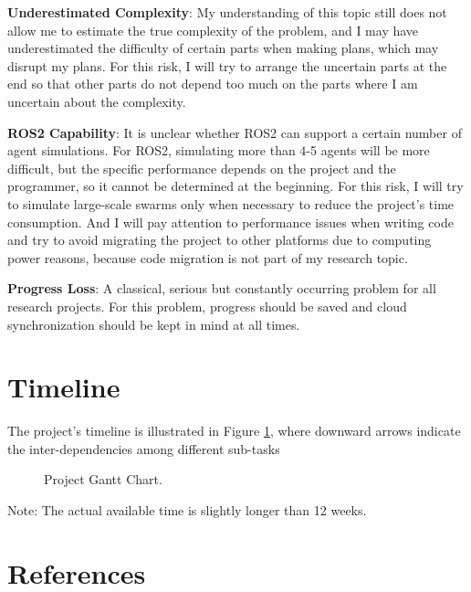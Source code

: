 \documentclass[12pt, oneside]{article}
\begin{document}
\textbf{Underestimated Complexity}: My understanding of this topic still does not allow me to estimate the true complexity of the problem, and I may have underestimated the difficulty of certain parts when making plans, which may disrupt my plans. For this risk, I will try to arrange the uncertain parts at the end so that other parts do not depend too much on the parts where I am uncertain about the complexity.

\textbf{ROS2 Capability}: It is unclear whether ROS2 can support a certain number of agent simulations. For ROS2, simulating more than 4-5 agents will be more difficult, but the specific performance depends on the project and the programmer, so it cannot be determined at the beginning. For this risk, I will try to simulate large-scale swarms only when necessary to reduce the project’s time consumption. And I will pay attention to performance issues when writing code and try to avoid migrating the project to other platforms due to computing power reasons, because code migration is not part of my research topic.

\textbf{Progress Loss}: A classical, serious but constantly occurring problem for all research projects. For this problem, progress should be saved and cloud synchronization should be kept in mind at all times.

\pagebreak
\section{Timeline}
The project's timeline is illustrated in Figure \ref{GanntChart}, where downward arrows indicate the inter-dependencies among different sub-tasks



\begin{figure}[htbp]
    \centering
    \caption{Project Gantt Chart.}
    \label{GanntChart}
\end{figure} 

Note: The actual available time is slightly longer than 12 weeks.

\pagebreak



\section{References}



\end{document}
